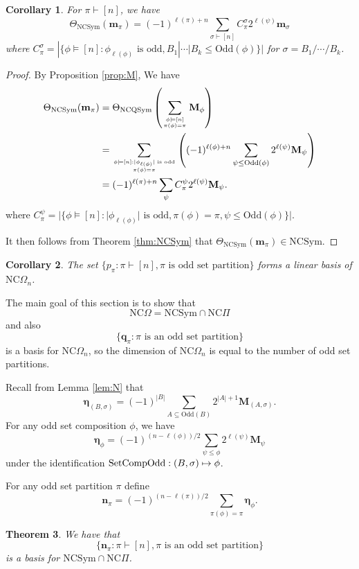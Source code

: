\documentclass[11pt]{amsart}
\newtheorem{Theorem}{Theorem}[section]
\newtheorem{Corollary}[Theorem]{Corollary}
\numberwithin{equation}{section}
\newcommand{\NCQSym}{\mathrm{NCQSym}}
\newcommand{\NCSym}{\mathrm{NCSym}}
\newcommand{\odd}{\mathrm{Odd}}
\newcommand{\NCPeak}{\mathrm{NC}\Pi}
\newcommand{\NCGamma}{\mathrm{NC}\Omega}
\newcommand{\bfM}{{\mathbf{M}}}
\newcommand{\boldeta}{{\boldsymbol{\eta}}}
\begin{document}
\begin{Corollary}
	For $\pi\vdash[n]$, we have
	$$\Theta_{\NCSym}(\mathbf{m}_\pi)=(-1)^{\ell(\pi)+n}\sum_{\sigma\vdash[n]}C_\pi^\sigma2^{\ell(\psi)}\mathbf{m}_\sigma$$
	where $C_\pi^\sigma=|\{\phi\models[n]:\phi_{\ell(\phi)}\text{ is odd}, B_1|\cdots|B_k\leq\mathrm{Odd}(\phi)\}|$ for $\sigma=B_1/\cdots/B_k$.
\end{Corollary}

\begin{proof}
	By Proposition \ref{prop:M}, We have
	\begin{align*}
		\Theta_\NCSym(\mathbf{m}_\pi)&=\Theta_\NCQSym\left(\sum_{\phi\models[n] \atop \pi(\phi)=\pi}\mathbf{M}_\phi\right)\\
		&=\sum_{\phi\models [n]:|\phi_{\ell(\phi)}|\text{ is odd} \atop \pi(\phi)=\pi}\left((-1)^{\ell(\phi)+n}\sum_{\psi\leq\mathrm{Odd}(\phi)}2^{\ell(\psi)}\mathbf{M}_\psi\right)\\
		&=(-1)^{\ell(\pi)+n}\sum_{\psi}C_\pi^\psi2^{\ell(\psi)}\mathbf{M}_\psi.
	\end{align*}
	where $C_\pi^\psi=|\{\phi\models[n]:|\phi_{\ell(\phi)}|\text{ is odd},\pi(\phi)=\pi,\psi\leq\mathrm{Odd}(\phi)\}|$.
	
	It then follows from Theorem \ref{thm:NCSym} that $\Theta_{\NCSym}(\mathbf{m}_\pi)\in\NCSym$.
\end{proof}
	
	
\begin{Corollary}\label{cor:p}
	The set $\{p_\pi:\pi\vdash[n],\pi\text{ is odd set partition}\}$ forms a linear basis of $\NCGamma_n$.
\end{Corollary}
The main goal of this section is to show that 
$$\NCGamma=\NCSym\cap\NCPeak$$
 and also $$\{\mathbf{q}_\pi: \pi \text{~is an odd set partition}\}$$ is a basis for $\NCGamma_n$, so the dimension of  $\NCGamma_n$ is equal to the number of odd set partitions.


Recall from Lemma \ref{lem:N} that
$$\boldeta_{(B,\sigma)}=(-1)^{|B|}\sum_{A\subseteq\odd(B)}2^{|A|+1}\mathbf{M}_{(A,\sigma)}.$$
For any odd set composition $\phi$, we have $$\boldeta_\phi=(-1)^{(n-\ell(\phi))/2}\sum_{\psi\leq \phi} 2^{\ell(\psi)}\bfM_\psi$$
under the identification ${\rm SetCompOdd}:(B,\sigma)\mapsto\phi$. 

For any odd set partition $\pi$ define 
$$\mathbf{n}_\pi=(-1)^{(n-\ell(\pi))/2}\sum_{\pi(\phi)=\pi} \boldeta_\phi.$$


\begin{Theorem}\label{thm:NCGamma}
	 We have that $$\{\mathbf{n}_\pi: \pi\vdash[n], \pi\text{ is an odd set partition}\}$$ is a basis for $\NCSym\cap\NCPeak$.
\end{Theorem}
\end{document}
